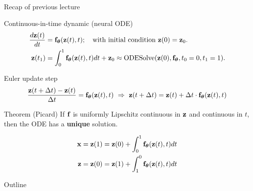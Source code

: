\begin{frame}{Recap of previous lecture}
	\begin{block}{Continuous-in-time dynamic (neural ODE)}
		\vspace{-0.7cm}
		\begin{align*}
		   \frac{d \mathbf{z}(t)}{dt} &= \mathbf{f}_{\boldsymbol{\theta}}(\mathbf{z}(t), t); \quad \text{with initial condition }\mathbf{z}(0) = \mathbf{z}_0. \\
		   \mathbf{z}(t_1) &= \int^{1}_{0} \mathbf{f}_{\boldsymbol{\theta}}(\mathbf{z}(t), t) d t  + \mathbf{z}_0 \approx \text{ODESolve}(\mathbf{z}(0), \mathbf{f}_{\boldsymbol{\theta}}, t_0=0, t_1=1).
		\end{align*}
		\vspace{-0.7cm}
	\end{block}	
	\begin{block}{Euler update step}
		\vspace{-0.6cm}
		\[
   \frac{\mathbf{z}(t + \Delta t) - \mathbf{z}(t)}{\Delta t} = \mathbf{f}_{\boldsymbol{\theta}}(\mathbf{z}(t), t) \,\, \Rightarrow \,\, \mathbf{z}(t + \Delta t) = \mathbf{z}(t) + \Delta t \cdot \mathbf{f}_{\boldsymbol{\theta}}(\mathbf{z}(t), t)
		\]
		\vspace{-0.7cm}
	\end{block}	
	\begin{block}{Theorem (Picard)}
		If $\mathbf{f}$ is uniformly Lipschitz continuous in $\mathbf{z}$ and continuous in $t$, then the ODE has a \textbf{unique} solution.
	\end{block}
		\vspace{-0.7cm}
		\begin{align*}
			\mathbf{x} &= \mathbf{z}(1) = \mathbf{z}(0) + \int_{0}^{1} \mathbf{f}_{\boldsymbol{\theta}}(\mathbf{z}(t), t) dt \\
			\mathbf{z} &= \mathbf{z}(0) = \mathbf{z}(1) + \int_{1}^{0} \mathbf{f}_{\boldsymbol{\theta}}(\mathbf{z}(t), t) dt
		\end{align*}
\end{frame}
\begin{frame}{Outline}
	\tableofcontents
\end{frame}
